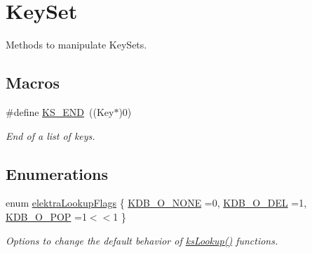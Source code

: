 \hypertarget{group__keyset}{}\section{Key\+Set}
\label{group__keyset}


Methods to manipulate Key\+Sets.  


\subsection*{Macros}
\begin{DoxyCompactItemize}
\item 
\#define \hyperlink{group__keyset_ga7a28fce3773b2c873c94ac80b8b4cd54}{K\+S\+\_\+\+E\+ND}~((Key$\ast$)0)
\begin{DoxyCompactList}\small\item\em End of a list of keys. \end{DoxyCompactList}\end{DoxyCompactItemize}
\subsection*{Enumerations}
\begin{DoxyCompactItemize}
\item 
enum \hyperlink{group__keyset_gada05f4bbf46fde81d0d57df86e73d914}{elektra\+Lookup\+Flags} \{ \hyperlink{group__keyset_ggada05f4bbf46fde81d0d57df86e73d914a00738455e0ae843c8720809d8287f370}{K\+D\+B\+\_\+\+O\+\_\+\+N\+O\+NE} =0, 
\hyperlink{group__keyset_ggada05f4bbf46fde81d0d57df86e73d914a66a5380c120f25f28f49848c4a863ead}{K\+D\+B\+\_\+\+O\+\_\+\+D\+EL} =1, 
\hyperlink{group__keyset_ggada05f4bbf46fde81d0d57df86e73d914a52fb5f2cc86773d393da62bebebf7984}{K\+D\+B\+\_\+\+O\+\_\+\+P\+OP} =1$<$$<$1
 \}\begin{DoxyCompactList}\small\item\em Options to change the default behavior of \hyperlink{group__keyset_ga60f1ddcf23272f2b29b90e92ebe9b56f}{ks\+Lookup()} functions. \end{DoxyCompactList}
\end{DoxyCompactItemize}
